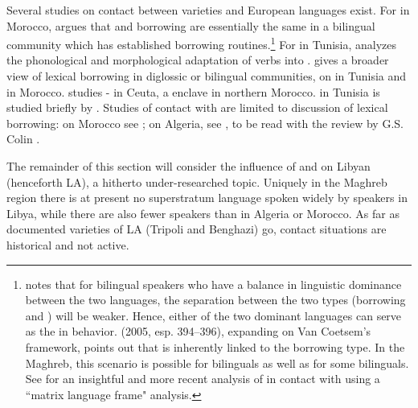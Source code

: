 \documentclass[output=paper]{langsci/langscibook}
\begin{document}
Several studies on contact between   varieties and European languages exist. For  in Morocco, \citet{Heath1989} argues that  and borrowing are essentially the same in a bilingual community which has established borrowing routines.\footnote{\citet[87]{VanCoetsem1988} notes that for bilingual speakers who have a balance in linguistic dominance between the two languages, the separation between the two  types (borrowing and ) will be weaker. Hence, either of the two dominant languages can serve as the  in  behavior. \citeauthor{Winford2005} (2005, esp. 394–396), expanding on Van Coetsem’s framework, points out that  is inherently linked to the borrowing  type. In the Maghreb, this scenario is possible for \textendash {} bilinguals as well as for some \textendash {} bilinguals. See \citet{Ziamari2008} for an insightful and more recent analysis of   in contact with  using a ``matrix language frame" analysis.} For  in Tunisia, \citet{Talmoudi1986} analyzes the phonological and morphological adaptation of  verbs into . \citet[127–151]{Sayahi2014} gives a broader view of lexical borrowing in diglossic or bilingual communities,  on  in Tunisia and  in Morocco. \citet{Vicente2005} studies -  in Ceuta, a  enclave in northern Morocco.  in Tunisia is studied briefly by \citet{Cifoletti1994}. Studies of contact with  are limited to discussion of lexical borrowing: on Morocco see \citet{Procházka2012}; on Algeria, see \citet{BenCheneb1922}, to be read with the review by G.S. Colin \citep[21–30]{Colin1999}.

The remainder of this section will consider the influence of  and  on Libyan  (henceforth LA), a hitherto under-researched topic. Uniquely in the Maghreb region there is at present no superstratum language spoken widely by  speakers in Libya, while there are also fewer  speakers than in Algeria or Morocco. As far as documented varieties of LA (Tripoli and Benghazi) go, contact situations are historical and not active.
\end{document}
